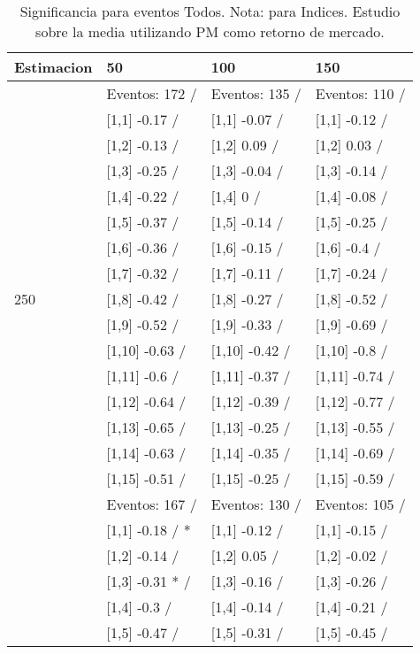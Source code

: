 \begin{table}

\caption{Significancia para eventos Todos. Nota: para Indices. Estudio sobre la media utilizando PM como retorno de mercado.}
\centering
\begin{tabular}[t]{llll}
\toprule
Estimacion & 50 & 100 & 150\\
\midrule
 & Eventos:  172 / & Eventos:  135 / & Eventos:  110 /\\
 & {}[1,1] -0.17  / & {}[1,1] -0.07  / & {}[1,1] -0.12  /\\
 & {}[1,2] -0.13  / & {}[1,2] 0.09  / & {}[1,2] 0.03  /\\
 & {}[1,3] -0.25  / & {}[1,3] -0.04  / & {}[1,3] -0.14  /\\
 & {}[1,4] -0.22  / & {}[1,4] 0  / & {}[1,4] -0.08  /\\
\addlinespace
 & {}[1,5] -0.37  / & {}[1,5] -0.14  / & {}[1,5] -0.25  /\\
 & {}[1,6] -0.36  / & {}[1,6] -0.15  / & {}[1,6] -0.4  /\\
 & {}[1,7] -0.32  / & {}[1,7] -0.11  / & {}[1,7] -0.24  /\\
250 & {}[1,8] -0.42  / & {}[1,8] -0.27  / & {}[1,8] -0.52  /\\
 & {}[1,9] -0.52  / & {}[1,9] -0.33  / & {}[1,9] -0.69  /\\
\addlinespace
 & {}[1,10] -0.63  / & {}[1,10] -0.42  / & {}[1,10] -0.8  /\\
 & {}[1,11] -0.6  / & {}[1,11] -0.37  / & {}[1,11] -0.74  /\\
 & {}[1,12] -0.64  / & {}[1,12] -0.39  / & {}[1,12] -0.77  /\\
 & {}[1,13] -0.65  / & {}[1,13] -0.25  / & {}[1,13] -0.55  /\\
 & {}[1,14] -0.63  / & {}[1,14] -0.35  / & {}[1,14] -0.69  /\\
\addlinespace
 & {}[1,15] -0.51  / & {}[1,15] -0.25  / & {}[1,15] -0.59  /\\
 & Eventos:  167 / & Eventos:  130 / & Eventos:  105 /\\
 & {}[1,1] -0.18  / * & {}[1,1] -0.12  / & {}[1,1] -0.15  /\\
 & {}[1,2] -0.14  / & {}[1,2] 0.05  / & {}[1,2] -0.02  /\\
 & {}[1,3] -0.31 * / & {}[1,3] -0.16  / & {}[1,3] -0.26  /\\
\addlinespace
 & {}[1,4] -0.3  / & {}[1,4] -0.14  / & {}[1,4] -0.21  /\\
 & {}[1,5] -0.47  / & {}[1,5] -0.31  / & {}[1,5] -0.45  /\\

\end{tabular}
\end{table}
